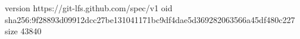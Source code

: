 version https://git-lfs.github.com/spec/v1
oid sha256:9f28893d09912dcc27be131041171bc9df4dae5d369282063566a45df480c227
size 43840
